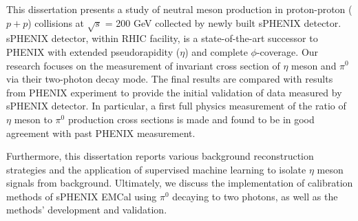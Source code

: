 
This dissertation presents a study of neutral meson production in proton-proton ($p+p$) collisions at $\sqrt{s}$ = 200 \ac{GeV} collected by newly built \ac{sPHENIX} detector. \ac{sPHENIX} detector, within \ac{RHIC} facility, is a state-of-the-art successor to \ac{PHENIX} with extended pseudorapidity ($\eta$) and complete $\phi$-coverage. Our research focuses on the measurement of invariant cross section of $\eta$ meson and $\pi^{0}$ via their two-photon decay mode. The final results are compared with results from \ac{PHENIX} experiment to provide the initial validation of data measured by \ac{sPHENIX} detector. In particular, a first full physics measurement of the ratio of $\eta$ meson to $\pi^0$ production cross sections is made and found to be in good agreement with past \ac{PHENIX} measurement. 

Furthermore, this dissertation reports various background reconstruction strategies and the application of supervised machine learning to isolate $\eta$ meson signals from background. Ultimately, we discuss the implementation of calibration methods of \ac{sPHENIX} \ac{EMCal} using $\pi^0$ decaying to two photons, as well as the methods' development and validation.
